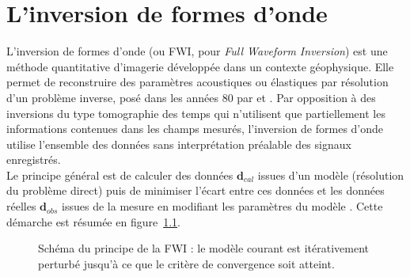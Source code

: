 \chapter{L'inversion de formes d'onde \label{fwi}}


L'inversion de formes d'onde (ou FWI, pour \emph{Full Waveform Inversion}) est une méthode quantitative d'imagerie développée dans un contexte géophysique. Elle permet de reconstruire des paramètres acoustiques ou élastiques par résolution d'un problème inverse, posé dans les années 80 par \cite{lailly} et \cite{tarantola_84}. Par opposition à des inversions du type tomographie des temps qui n'utilisent que partiellement les informations contenues dans les champs mesurés, l'inversion de formes d'onde utilise l'ensemble des données sans interprétation préalable des signaux enregistrés.\\

Le principe général est de calculer des données $\bm{d}_{cal}$ issues d'un modèle (résolution du problème direct)  puis de minimiser l'écart entre ces données et les données réelles $\bm{d}_{obs}$ issues de la mesure en modifiant les paramètres du modèle \citep{virieux_review}. Cette démarche est résumée en figure~\ref{schema_fwi}. \\


\begin{figure}[!h]
	\caption{ Schéma du principe de la FWI : le modèle courant est itérativement perturbé jusqu'à ce que le critère de convergence soit atteint.\label{schema_fwi}}
\end{figure}

